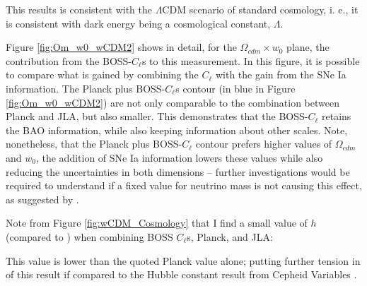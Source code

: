 
This results is consistent with the $\Lambda$CDM scenario of standard cosmology, i. e., it is consistent with dark energy being a cosmological constant, $\Lambda$. 

\qquad Figure \ref{fig:Om_w0_wCDM2} shows in detail, for the $\Omega_{cdm} \times w_0$ plane, the contribution from the BOSS-$C_{\ell}$s to this measurement. In this figure, it is possible to compare what is gained by combining the $C_{\ell}$ with the gain from the SNe Ia information. The Planck plus BOSS-$C_{\ell}$s contour (in blue in Figure \ref{fig:Om_w0_wCDM2}) are not only comparable to the combination between Planck and JLA, but also smaller. This demonstrates that the BOSS-$C_{\ell}$ retains the BAO information, while also keeping information about other scales. Note, nonetheless, that the Planck plus BOSS-$C_{\ell}$ contour prefers higher values of $\Omega_{cdm}$ and $w_0$, the addition of SNe Ia information lowers these values while also reducing the uncertainties in both dimensions -- further investigations would be required to understand if a fixed value for neutrino mass is not causing this effect, as suggested by \cite{2018-Vagnozzi}. 


\qquad Note from Figure \ref{fig:wCDM_Cosmology} that I find a small value of $h$ (compared to \citealt{PlanckCosmology2016}) when combining BOSS $C_{\ell}$s, Planck, and JLA:


This value is lower than the quoted Planck value alone; putting further tension in of this result if compared to the Hubble constant result from Cepheid Variables \citep{Riess2016, Riess2018}. 

